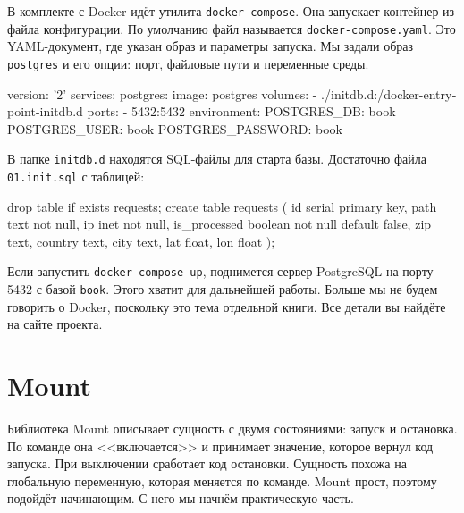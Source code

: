 
В комплекте с Docker идёт утилита \verb|docker-compose|. Она запускает
контейнер из файла конфигурации. По умолчанию файл называется
\verb|docker-compose.yaml|. Это YAML-документ, где указан образ и параметры
запуска. Мы задали образ \verb|postgres| и его опции: порт, файловые пути и
переменные среды.


\begin{english}
  \begin{yaml}
version: '2'
services:
  postgres:
    image: postgres
    volumes:
      - ./initdb.d:/docker-entrypoint-initdb.d
    ports:
      - 5432:5432
    environment:
      POSTGRES_DB: book
      POSTGRES_USER: book
      POSTGRES_PASSWORD: book
  \end{yaml}
\end{english}

В папке \verb|initdb.d| находятся SQL-файлы для старта базы. Достаточно файла
\verb|01.init.sql| с таблицей:


\begin{english}
  \begin{sql}
drop table if exists requests;
create table requests (
    id            serial primary key,
    path          text not null,
    ip            inet not null,
    is_processed  boolean not null default false,
    zip           text,
    country       text,
    city          text,
    lat           float,
    lon           float
);
  \end{sql}
\end{english}

Если запустить \verb|docker-compose up|, поднимется сервер PostgreSQL на порту
5432 с базой \verb|book|. Этого хватит для дальнейшей работы. Больше мы не
будем говорить о Docker, поскольку это тема отдельной книги. Все детали вы
найдёте на сайте проекта.

\section{Mount}


Библиотека Mount описывает сущность с
двумя состояниями: запуск и остановка. По команде она <<включается>> и принимает
значение, которое вернул код запуска. При выключении сработает код
остановки. Сущность похожа на глобальную переменную, которая меняется по
команде. Mount прост, поэтому подойдёт начинающим. С него мы начнём
практическую часть.

